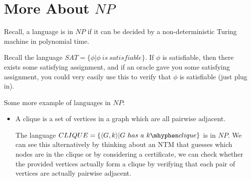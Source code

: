 



\section*{More About $NP$}

Recall, a language is in $NP$ if it can be decided by a non-deterministic Turing machine in polynomial time.

Recall the language $SAT=\{\phi|\phi \ is \ satisfiable\}$.  If $\phi$ is satisfiable, then there exists some satisfying assignment, and if an oracle gave you some satisfying assignment, you could very easily use this to verify that $\phi$ is satisfiable (just plug in).



Some more example of languages in $NP$:
\begin{itemize}
	
	\item A clique is a set of vertices in a graph which are all pairwise adjacent.  
	
	The language $CLIQUE = \{   \langle G,k\rangle | G \ has \ a \ k\mhyphen clique \}$ is in $NP$.  We can see this alternatively by thinking about an NTM that guesses which nodes are in the clique or by considering a certificate, we can check whether the provided vertices actually form a clique by verifying that each pair of vertices are actually pairwise adjacent.

\end{itemize}



